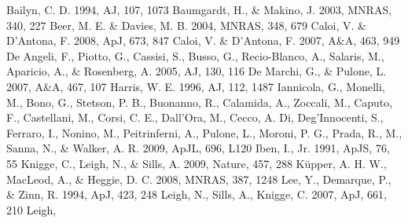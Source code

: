 \begin{thebibliography}{99}
 Bailyn,
  C. D. 1994, AJ, 107, 1073
 Baumgardt, H., \& Makino, J. 2003,
  MNRAS, 340, 227 
 Beer,
  M. E. \& Davies, M. B. 2004, MNRAS, 348, 679
  Caloi, V. \& D'Antona, F. 2008, ApJ, 673, 847 
  Caloi, V. \& D'Antona, F. 2007, A\&A, 463, 949
  De Angeli, F., Piotto, G., Cassisi, S., Busso, G., Recio-Blanco, A.,
  Salaris, M., Aparicio, A., \& Rosenberg, A. 2005, AJ, 130, 116
  De Marchi, G., \& Pulone, L. 2007, A\&A, 467, 107
  Harris, W. E. 1996, AJ, 112, 1487
  Iannicola, G., Monelli, M., Bono, G., Stetson, P. B., Buonanno, R.,
  Calamida, A., Zoccali, M., Caputo, F., Castellani, M., Corsi, C. E.,
  Dall'Ora, M., Cecco, A. Di, Deg'Innocenti, S., Ferraro, I., Nonino,
  M., Peitrinferni, A., Pulone, L., Moroni, P. G., Prada, R., M.,
  Sanna, N., \& Walker, A. R. 2009, ApJL, 696, L120
 Iben, I.,
  Jr. 1991, ApJS, 76, 55
  Knigge, C., Leigh, N., \& Sills, A. 2009, Nature, 457, 288
  K\"upper, A. H. W., MacLeod, A., \& Heggie, D. C. 2008, MNRAS, 387,
  1248 
 Lee, Y.,
  Demarque, P., \& Zinn, R. 1994, ApJ, 423, 248
 Leigh,
  N., Sills, A., Knigge, C. 2007, ApJ, 661, 210
 Leigh,

\end{thebibliography}
